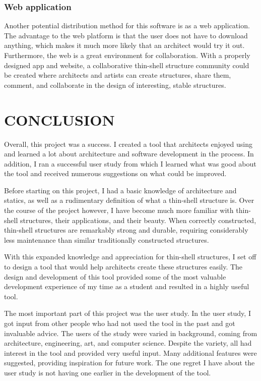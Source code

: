 \documentclass{thesis}
\begin{document}
\subsection{Web application}
Another potential distribution method for this software is as a web application.  The advantage to the web platform is that the
user does not have to download anything, which makes it much more likely that an architect would try it out.  Furthermore, the
web is a great environment for collaboration.  With a properly designed app and website, a collaborative thin-shell structure
community could be created where architects and artists can create structures, share them, comment, and collaborate in the
design of interesting, stable structures.


\chapter{CONCLUSION}
Overall, this project was a success.  I created a tool that architects enjoyed using and learned a lot about architecture and
software development in the process.  In addition, I ran a successful user study from which I learned what was good about the 
tool and received numerous suggestions on what could be improved.

Before starting on this project, I had a basic knowledge of architecture and statics, as well as a rudimentary definition of what
a thin-shell structure is.  Over the course of the project however, I have become much more familiar with thin-shell structures,
their applications, and their beauty.  When correctly constructed, thin-shell structures are remarkably strong and durable,
requiring considerably less maintenance than similar traditionally constructed structures.

With this expanded knowledge and appreciation for thin-shell structures, I set off to design a tool that would help architects
create these structures easily.  The design and development of this tool provided some of the most valuable development experience
of my time as a student and resulted in a highly useful tool.

The most important part of this project was the user study.  In the user study, I got input from other people who had not used the
tool in the past and got invaluable advice.  The users of the study were varied in background, coming from architecture, engineering,
art, and computer science.  Despite the variety, all had interest in the tool and provided very useful input.  Many additional features
were suggested, providing inspiration for future work.  The one regret I have about the user study is not having one earlier in the
development of the tool.
\end{document}
